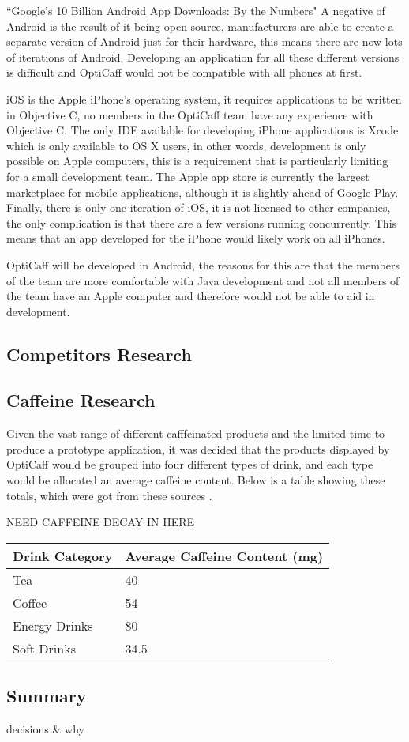 ``Google’s 10 Billion Android App Downloads: By the Numbers" \newline
A negative of Android is the result of it being open-source, manufacturers are able to create a separate version of Android just for their hardware, this means there are now lots of iterations of Android. Developing an application for all these different versions is difficult and OptiCaff would not be compatible with all phones at first.

iOS is the Apple iPhone’s operating system, it requires applications to be written in Objective C, no members in the OptiCaff team have any experience with Objective C. The only IDE available for developing iPhone applications is Xcode which is only available to OS X users, in other words, development is only possible on Apple computers, this is a requirement that is particularly limiting for a small development team. The Apple app store is currently the largest marketplace for mobile applications, although it is slightly ahead of Google Play. Finally, there is only one iteration of iOS, it is not licensed to other companies, the only complication is that there are a few versions running concurrently. This means that an app developed for the iPhone would likely work on all iPhones.

OptiCaff will be developed in Android, the reasons for this are that the members of the team are more comfortable with Java development and not all members of the team have an Apple computer and therefore would not be able to aid in development.

\subsection{Competitors Research}
\label{sec:Competitors}

\subsection{Caffeine Research}
\label{sec:Caffeine}
Given the vast range of different cafffeinated products and the limited time to produce a prototype application, it was decided that the products displayed by OptiCaff would be grouped into four different types of drink, and each type would be allocated an average caffeine content. Below is a table showing these totals, which were got from these sources \cite{Coke} \cite{TeaCoffee} \cite{EnergyDrink}.

NEED CAFFEINE DECAY IN HERE

\begin{center}
\begin{tabular}{|l|l|}
\hline
\textbf{Drink Category} & \textbf{Average Caffeine Content (mg)} \\\hline
Tea & 40 \\\hline
Coffee & 54 \\\hline
Energy Drinks & 80 \\\hline
Soft Drinks & 34.5 \\\hline
\end{tabular}
\end{center}

\subsection{Summary}
decisions \& why 